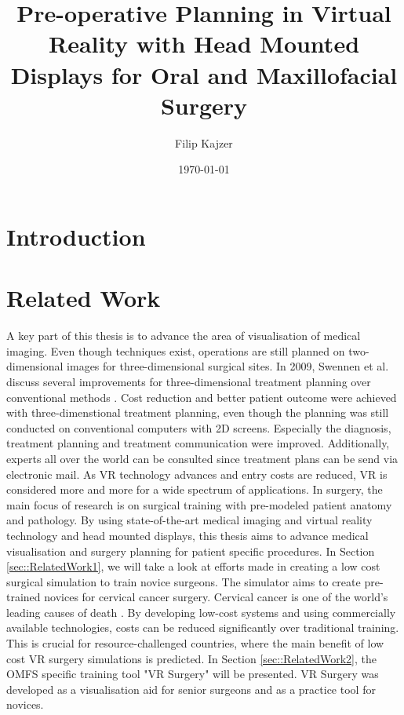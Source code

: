 \documentclass[twoside, parskip]{VRThesis} %
\title{Pre-operative Planning in Virtual Reality with Head Mounted Displays for Oral and Maxillofacial Surgery}
\author{Filip Kajzer}
\date{\today}
\begin{document}
 



\tableofcontents

\chapter{Introduction}



\chapter{Related Work}

A key part of this thesis is to advance the area of visualisation of medical imaging.
Even though techniques exist, operations are still planned on two-dimensional images for three-dimensional surgical sites.
In 2009, Swennen et al. discuss several improvements for three-dimensional treatment planning over conventional methods \cite{swennen2009three}.
Cost reduction and better patient outcome were achieved with three-dimenstional treatment planning, even though the planning was still conducted on conventional computers with 2D screens.
Especially the diagnosis, treatment planning and treatment communication were improved.
Additionally, experts all over the world can be consulted since treatment plans can be send via electronic mail.
As VR technology advances and entry costs are reduced, VR is considered more and more for a wide spectrum of applications.
In surgery, the main focus of research is on surgical training with pre-modeled patient anatomy and pathology.
By using state-of-the-art medical imaging and virtual reality technology and head mounted displays, this thesis aims to advance medical visualisation and surgery planning for patient specific procedures.
In Section \ref{sec::RelatedWork1}, we will take a look at efforts made in creating a low cost surgical simulation to train novice surgeons.
The simulator aims to create pre-trained novices for cervical cancer surgery. 
Cervical cancer is one of the world's leading causes of death \cite{RN52}.
By developing low-cost systems and using commercially available technologies, costs can be reduced significantly over traditional training.
This is crucial for resource-challenged countries, where the main benefit of low cost VR surgery simulations is predicted.
In Section \ref{sec::RelatedWork2}, the OMFS specific training tool "VR Surgery" will be presented.
VR Surgery was developed as a visualisation aid for senior surgeons and as a practice tool for novices.   
\end{document}
